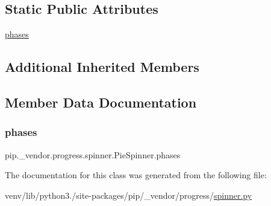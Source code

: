 \subsection*{Static Public Attributes}
\begin{DoxyCompactItemize}
\item 
\hyperlink{classpip_1_1__vendor_1_1progress_1_1spinner_1_1PieSpinner_a9c85eb94d6667039519f3dd1a1b7d121}{phases}
\end{DoxyCompactItemize}
\subsection*{Additional Inherited Members}


\subsection{Member Data Documentation}
\mbox{\label{classpip_1_1__vendor_1_1progress_1_1spinner_1_1PieSpinner_a9c85eb94d6667039519f3dd1a1b7d121}} 
\subsubsection{\texorpdfstring{phases}{phases}}
{\footnotesize\ttfamily pip.\+\_\+vendor.\+progress.\+spinner.\+Pie\+Spinner.\+phases\hspace{0.3cm}{\ttfamily [static]}}



The documentation for this class was generated from the following file\+:\begin{DoxyCompactItemize}
\item 
venv/lib/python3./site-\/packages/pip/\+\_\+vendor/progress/\hyperlink{spinner_8py}{spinner.\+py}\end{DoxyCompactItemize}
